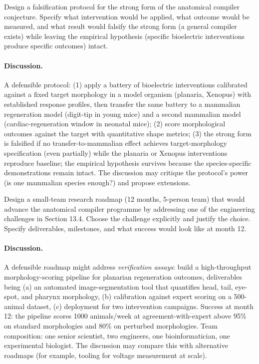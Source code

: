 \begin{exercise}
Design a falsification protocol for the strong form of the anatomical
compiler conjecture. Specify what intervention would be applied, what
outcome would be measured, and what result would falsify the strong
form (a general compiler exists) while leaving the empirical
hypothesis (specific bioelectric interventions produce specific
outcomes) intact.

\paragraph{Discussion.}
A defensible protocol: (1) apply a battery of bioelectric
interventions calibrated against a fixed target morphology in a
model organism (planaria, Xenopus) with established response
profiles, then transfer the same battery to a mammalian regeneration
model (digit-tip in young mice) and a second mammalian model
(cardiac-regeneration window in neonatal mice); (2) score
morphological outcomes against the target with quantitative shape
metrics; (3) the strong form is falsified if no transfer-to-mammalian
effect achieves target-morphology specification (even partially) while
the planaria or Xenopus interventions reproduce baseline; the
empirical hypothesis survives because the species-specific
demonstrations remain intact. The discussion may critique the
protocol's power (is one mammalian species enough?) and propose
extensions.
\end{exercise}

\begin{exercise}
Design a small-team research roadmap (12 months, 5-person team) that
would advance the anatomical compiler programme by addressing one of
the engineering challenges in Section 13.4. Choose the challenge
explicitly and justify the choice. Specify deliverables, milestones,
and what success would look like at month 12.

\paragraph{Discussion.}
A defensible roadmap might address \emph{verification assays}: build a
high-throughput morphology-scoring pipeline for planarian
regeneration outcomes, deliverables being (a) an automated
image-segmentation tool that quantifies head, tail, eye-spot, and
pharynx morphology, (b) calibration against expert scoring on a
500-animal dataset, (c) deployment for two intervention campaigns.
Success at month 12: the pipeline scores 1000 animals/week at
agreement-with-expert above 95\% on standard morphologies and 80\% on
perturbed morphologies. Team composition: one senior scientist, two
engineers, one bioinformatician, one experimental biologist. The
discussion may compare this with alternative roadmaps (for example,
tooling for voltage measurement at scale).
\end{exercise}

